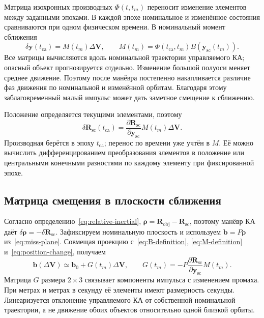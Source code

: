\documentclass[a4paper,11pt]{article}
\newcommand{\vect}[1]{\boldsymbol{#1}}
\numberwithin{equation}{section}
\begin{document}
Матрица изохронных производных $\Phi(t,t_m)$ переносит изменение
элементов между заданными эпохами. В каждой эпохе номинальное
и изменённое состояния сравниваются при одном физическом времени.
В номинальный момент сближения
\begin{equation}
 \delta\vect y(t_{\mathrm{ca}})=M(t_m)\Delta\vect V,
 \qquad
 M(t_m)=\Phi(t_{\mathrm{ca}},t_m)B(\vect y_{\mathrm{sc}}(t_m)).
 \label{eq:M-definition}
\end{equation}
Все матрицы вычисляются вдоль номинальной траектории управляемого КА;
опасный объект прогнозируется отдельно. Изменение большой полуоси
меняет среднее движение. Поэтому после манёвра постепенно
накапливается различие фаз движения по номинальной и изменённой
орбитам. Благодаря этому заблаговременный малый импульс может дать
заметное смещение к сближению.

Положение определяется текущими элементами, поэтому
\begin{equation}
 \delta\vect R_{\mathrm{sc}}(t_{\mathrm{ca}})=
 \frac{\partial\vect R_{\mathrm{sc}}}{\partial\vect y_{\mathrm{sc}}}
 M(t_m)\Delta\vect V.
 \label{eq:position-change}
\end{equation}
Производная берётся в эпоху $t_{\mathrm{ca}}$; перенос по времени
уже учтён в $M$. Её можно вычислить дифференцированием преобразования
элементов в положение или центральными конечными разностями
по каждому элементу при фиксированной эпохе.

\subsection{Матрица смещения в плоскости сближения}

Согласно определению~\eqref{eq:relative-inertial},
$\vect\rho=\vect R_{\mathrm{obj}}-\vect R_{\mathrm{sc}}$,
поэтому манёвр КА даёт
$\delta\vect\rho=-\delta\vect R_{\mathrm{sc}}$.
Зафиксируем номинальную плоскость и используем
$\vect b=P\vect\rho$ из~\eqref{eq:miss-plane}.
Совмещая проекцию с~\eqref{eq:B-definition},
\eqref{eq:M-definition} и~\eqref{eq:position-change}, получаем
\begin{equation}
 \boxed{\quad
 \vect b(\Delta\vect V)\simeq\vect b_0+G(t_m)\Delta\vect V,
 \qquad
 G(t_m)=-P\frac{\partial\vect R_{\mathrm{sc}}}{\partial\vect y_{\mathrm{sc}}}M(t_m).
 \quad}
 \label{eq:G-definition}
\end{equation}
Матрица $G$ размера $2\times3$ связывает компоненты импульса
с изменением промаха. При метрах и метрах в секунду её элементы
имеют размерность секунды. Линеаризуется отклонение управляемого КА
от собственной номинальной траектории, а не движение обоих
объектов относительно одной близкой орбиты.
\end{document}
